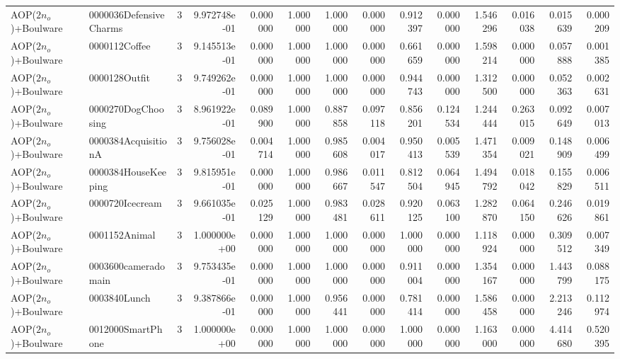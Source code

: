 \begin{tabular}{llrr|r|rr|rr|rr|rrr}
    AOP($2 n_o$)+Boulware & 0000036DefensiveCharms &       3 & 9.972748e-01 & 0.000000 & 1.000000 &      1.000000 & 0.000000 &      0.912397 & 0.000000 &      1.546296 &    0.016038 &     0.015639 &    0.000209 \\
    AOP($2 n_o$)+Boulware &          0000112Coffee &       3 & 9.145513e-01 & 0.000000 & 1.000000 &      1.000000 & 0.000000 &      0.661659 & 0.000000 &      1.598214 &    0.000000 &     0.057888 &    0.001385 \\
    AOP($2 n_o$)+Boulware &          0000128Outfit &       3 & 9.749262e-01 & 0.000000 & 1.000000 &      1.000000 & 0.000000 &      0.944743 & 0.000000 &      1.312500 &    0.000000 &     0.052363 &    0.002631 \\
    AOP($2 n_o$)+Boulware &     0000270DogChoosing &       3 & 8.961922e-01 & 0.089900 & 1.000000 &      0.887858 & 0.097118 &      0.856201 & 0.124534 &      1.244444 &    0.263015 &     0.092649 &    0.007013 \\
    AOP($2 n_o$)+Boulware &    0000384AcquisitionA &       3 & 9.756028e-01 & 0.004714 & 1.000000 &      0.985608 & 0.004017 &      0.950413 & 0.005539 &      1.471354 &    0.009021 &     0.148909 &    0.006499 \\
    AOP($2 n_o$)+Boulware &    0000384HouseKeeping &       3 & 9.815951e-01 & 0.000000 & 1.000000 &      0.986667 & 0.011547 &      0.812504 & 0.064945 &      1.494792 &    0.018042 &     0.155829 &    0.006511 \\
    AOP($2 n_o$)+Boulware &        0000720Icecream &       3 & 9.661035e-01 & 0.025129 & 1.000000 &      0.983481 & 0.028611 &      0.920125 & 0.063100 &      1.282870 &    0.064150 &     0.246626 &    0.019861 \\
    AOP($2 n_o$)+Boulware &          0001152Animal &       3 & 1.000000e+00 & 0.000000 & 1.000000 &      1.000000 & 0.000000 &      1.000000 & 0.000000 &      1.118924 &    0.000000 &     0.309512 &    0.007349 \\
    AOP($2 n_o$)+Boulware &    0003600cameradomain &       3 & 9.753435e-01 & 0.000000 & 1.000000 &      1.000000 & 0.000000 &      0.911004 & 0.000000 &      1.354167 &    0.000000 &     1.443799 &    0.088175 \\
    AOP($2 n_o$)+Boulware &           0003840Lunch &       3 & 9.387866e-01 & 0.000000 & 1.000000 &      0.956441 & 0.000000 &      0.781414 & 0.000000 &      1.586458 &    0.000000 &     2.213246 &    0.112974 \\
    AOP($2 n_o$)+Boulware &      0012000SmartPhone &       3 & 1.000000e+00 & 0.000000 & 1.000000 &      1.000000 & 0.000000 &      1.000000 & 0.000000 &      1.163000 &    0.000000 &     4.414680 &    0.520395 \\

\end{tabular}
